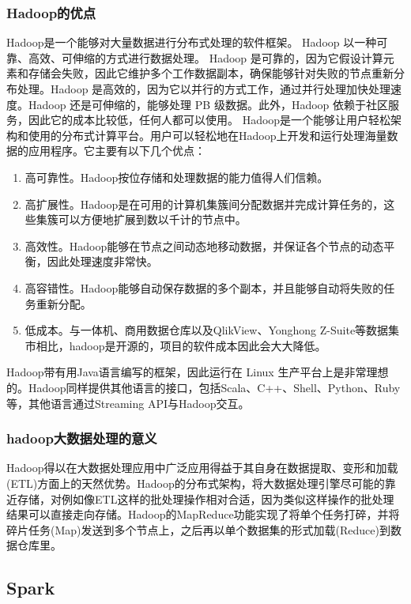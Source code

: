     \subsubsection{Hadoop的优点}
    Hadoop是一个能够对大量数据进行分布式处理的软件框架。 Hadoop 以一种可靠、高效、可伸缩的方式进行数据处理。
    Hadoop 是可靠的，因为它假设计算元素和存储会失败，因此它维护多个工作数据副本，确保能够针对失败的节点重新分布处理。Hadoop 是高效的，因为它以并行的方式工作，通过并行处理加快处理速度。Hadoop 还是可伸缩的，能够处理 PB 级数据。此外，Hadoop 依赖于社区服务，因此它的成本比较低，任何人都可以使用。
    Hadoop是一个能够让用户轻松架构和使用的分布式计算平台。用户可以轻松地在Hadoop上开发和运行处理海量数据的应用程序。它主要有以下几个优点：
    \begin{enumerate}
    \item 高可靠性。Hadoop按位存储和处理数据的能力值得人们信赖。
    \item 高扩展性。Hadoop是在可用的计算机集簇间分配数据并完成计算任务的，这些集簇可以方便地扩展到数以千计的节点中。
    \item 高效性。Hadoop能够在节点之间动态地移动数据，并保证各个节点的动态平衡，因此处理速度非常快。
    \item 高容错性。Hadoop能够自动保存数据的多个副本，并且能够自动将失败的任务重新分配。
    \item 低成本。与一体机、商用数据仓库以及QlikView、Yonghong Z-Suite等数据集市相比，hadoop是开源的，项目的软件成本因此会大大降低。
    \end{enumerate}
    Hadoop带有用Java语言编写的框架，因此运行在 Linux 生产平台上是非常理想的。Hadoop同样提供其他语言的接口，包括Scala、C++、Shell、Python、Ruby等，其他语言通过Streaming API与Hadoop交互。
    \subsubsection{hadoop大数据处理的意义}
    Hadoop得以在大数据处理应用中广泛应用得益于其自身在数据提取、变形和加载(ETL)方面上的天然优势。Hadoop的分布式架构，将大数据处理引擎尽可能的靠近存储，对例如像ETL这样的批处理操作相对合适，因为类似这样操作的批处理结果可以直接走向存储。Hadoop的MapReduce功能实现了将单个任务打碎，并将碎片任务(Map)发送到多个节点上，之后再以单个数据集的形式加载(Reduce)到数据仓库里。

  \subsection{Spark}

\ifx\usechapbib\empty
\nocite{BSTcontrol}
\setcounter{NAT@ctr}{0}


\fi

